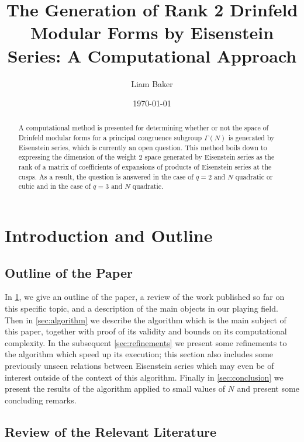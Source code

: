 \documentclass[11pt]{article}
\title{The Generation of Rank 2 Drinfeld Modular Forms by Eisenstein Series: A Computational Approach}
\author{Liam Baker}
\date{\today}
\begin{document}
 \maketitle

\begin{abstract}
  A computational method is presented for determining whether or not the space of Drinfeld modular forms for a principal congruence subgroup $\Gamma(N)$ is generated by Eisenstein series, which is currently an open question.
  This method boils down to expressing the dimension of the weight $2$ space generated by Eisenstein series as the rank of a matrix of coefficients of expansions of products of Eisenstein series at the cusps.
  As a result, the question is answered in the case of $q = 2$ and $N$ quadratic or cubic and in the case of $q = 3$ and $N$ quadratic.
\end{abstract}


\section{Introduction and Outline} \label{sec:intro}

\subsection{Outline of the Paper} \label{ssec:outline}

In \cref{sec:intro}, we give an outline of the paper, a review of the work published so far on this specific topic, and a description of the main objects in our playing field.
Then in \cref{sec:algorithm} we describe the algorithm which is the main subject of this paper, together with proof of its validity and bounds on its computational complexity.
In the subsequent \cref{sec:refinements} we present some refinements to the algorithm which speed up its execution; this section also includes some previously unseen relations between Eisenstein series which may even be of interest outside of the context of this algorithm.
Finally in \cref{sec:conclusion} we present the results of the algorithm applied to small values of $N$ and present some concluding remarks.


\subsection{Review of the Relevant Literature} \label{ssec:review}
\end{document}

